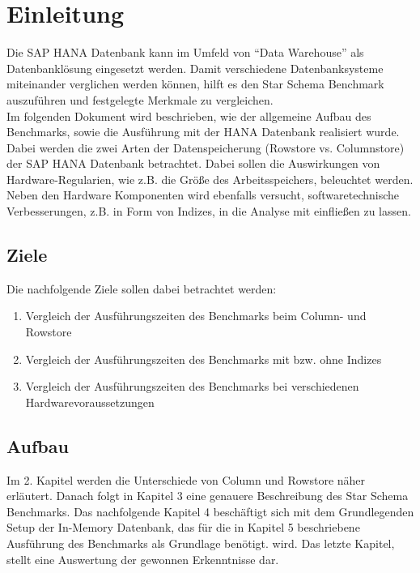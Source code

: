 \chapter{Einleitung}

Die SAP HANA Datenbank kann im Umfeld von \enquote{Data Warehouse} als Datenbanklösung eingesetzt werden. Damit verschiedene Datenbanksysteme miteinander verglichen werden können, hilft es den Star Schema Benchmark auszuführen und festgelegte Merkmale zu vergleichen.\\Im folgenden Dokument wird beschrieben, wie der allgemeine Aufbau des Benchmarks, sowie die Ausführung mit der HANA Datenbank realisiert wurde. Dabei werden die zwei Arten der Datenspeicherung (Rowstore vs. Columnstore) der SAP HANA Datenbank betrachtet. Dabei sollen die Auswirkungen von Hardware-Regularien, wie z.B. die Größe des Arbeitsspeichers, beleuchtet werden. Neben den Hardware Komponenten wird ebenfalls versucht, softwaretechnische Verbesserungen, z.B. in Form von Indizes, in die Analyse mit einfließen zu lassen.

\section{Ziele}
Die nachfolgende Ziele sollen dabei betrachtet werden:
\begin{enumerate}
	\item Vergleich der Ausführungszeiten des Benchmarks beim Column- und Rowstore
	\item Vergleich der Ausführungszeiten des Benchmarks mit bzw. ohne Indizes
	\item Vergleich der Ausführungszeiten des Benchmarks bei verschiedenen Hardwarevoraussetzungen
\end{enumerate}

\section{Aufbau}
Im 2. Kapitel werden die Unterschiede von Column und Rowstore näher erläutert. Danach folgt in Kapitel 3 eine genauere Beschreibung des Star Schema Benchmarks. Das nachfolgende Kapitel 4 beschäftigt sich mit dem Grundlegenden Setup der In-Memory Datenbank, das für die in Kapitel 5 beschriebene Ausführung des Benchmarks als Grundlage benötigt. wird. Das letzte Kapitel, stellt eine Auswertung der gewonnen Erkenntnisse dar.
